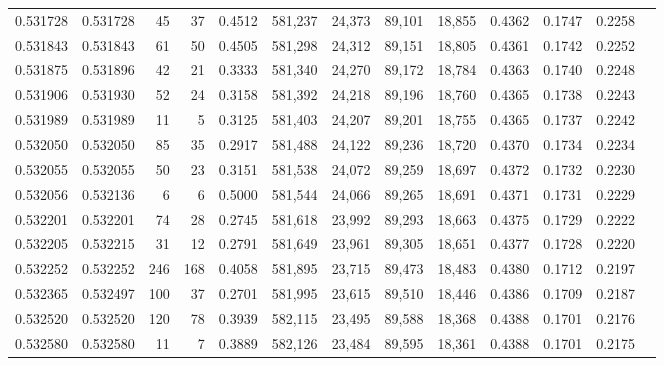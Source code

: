 \begin{tabular}{rrrrrrrrrrrrr}
0.531728 & 0.531728 &    45 &    37 &                                     0.4512 & 581,237 &  24,373 &  89,101 &  18,855 & 0.4362 & 0.1747 & 0.2258 \\
0.531843 & 0.531843 &    61 &    50 &                                     0.4505 & 581,298 &  24,312 &  89,151 &  18,805 & 0.4361 & 0.1742 & 0.2252 \\
0.531875 & 0.531896 &    42 &    21 &                                     0.3333 & 581,340 &  24,270 &  89,172 &  18,784 & 0.4363 & 0.1740 & 0.2248 \\
0.531906 & 0.531930 &    52 &    24 &                                     0.3158 & 581,392 &  24,218 &  89,196 &  18,760 & 0.4365 & 0.1738 & 0.2243 \\
0.531989 & 0.531989 &    11 &     5 &                                     0.3125 & 581,403 &  24,207 &  89,201 &  18,755 & 0.4365 & 0.1737 & 0.2242 \\
0.532050 & 0.532050 &    85 &    35 &                                     0.2917 & 581,488 &  24,122 &  89,236 &  18,720 & 0.4370 & 0.1734 & 0.2234 \\
0.532055 & 0.532055 &    50 &    23 &                                     0.3151 & 581,538 &  24,072 &  89,259 &  18,697 & 0.4372 & 0.1732 & 0.2230 \\
0.532056 & 0.532136 &     6 &     6 &                                     0.5000 & 581,544 &  24,066 &  89,265 &  18,691 & 0.4371 & 0.1731 & 0.2229 \\
0.532201 & 0.532201 &    74 &    28 &                                     0.2745 & 581,618 &  23,992 &  89,293 &  18,663 & 0.4375 & 0.1729 & 0.2222 \\
0.532205 & 0.532215 &    31 &    12 &                                     0.2791 & 581,649 &  23,961 &  89,305 &  18,651 & 0.4377 & 0.1728 & 0.2220 \\
0.532252 & 0.532252 &   246 &   168 &                                     0.4058 & 581,895 &  23,715 &  89,473 &  18,483 & 0.4380 & 0.1712 & 0.2197 \\
0.532365 & 0.532497 &   100 &    37 &                                     0.2701 & 581,995 &  23,615 &  89,510 &  18,446 & 0.4386 & 0.1709 & 0.2187 \\
0.532520 & 0.532520 &   120 &    78 &                                     0.3939 & 582,115 &  23,495 &  89,588 &  18,368 & 0.4388 & 0.1701 & 0.2176 \\
0.532580 & 0.532580 &    11 &     7 &                                     0.3889 & 582,126 &  23,484 &  89,595 &  18,361 & 0.4388 & 0.1701 & 0.2175 \\

\end{tabular}
